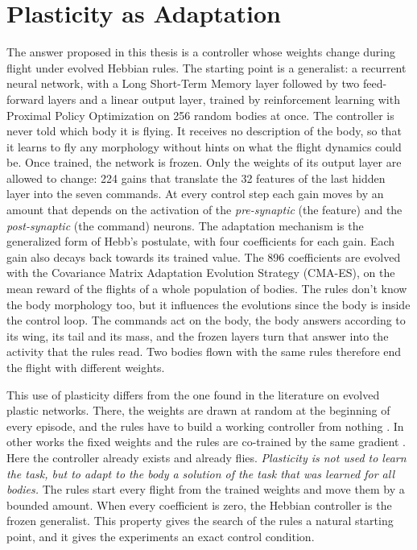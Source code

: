 \section{Plasticity as Adaptation}
\label{sec:intro-plasticity}

The answer proposed in this thesis is a controller whose weights change during flight under evolved Hebbian rules. The starting point is a generalist: a recurrent neural network, with a Long Short-Term Memory layer followed by two feed-forward layers and a linear output layer, trained by reinforcement learning with Proximal Policy Optimization on 256 random bodies at once. The controller is never told which body it is flying. It receives no description of the body, so that it learns to fly any morphology without hints on what the flight dynamics could be. Once trained, the network is frozen. Only the weights of its output layer are allowed to change: 224 gains that translate the 32 features of the last hidden layer into the seven commands. At every control step each gain moves by an amount that depends on the activation of the \emph{pre-synaptic} (the feature) and the \emph{post-synaptic} (the command) neurons. The adaptation mechanism is the generalized form of Hebb's postulate, with four coefficients for each gain. Each gain also decays back towards its trained value. The 896 coefficients are evolved with the Covariance Matrix Adaptation Evolution Strategy (CMA-ES), on the mean reward of the flights of a whole population of bodies. The rules don't know the body morphology too, but it influences the evolutions since the body is inside the control loop. The commands act on the body, the body answers according to its wing, its tail and its mass, and the frozen layers turn that answer into the activity that the rules read. Two bodies flown with the same rules therefore end the flight with different weights.

This use of plasticity differs from the one found in the literature on evolved plastic networks. There, the weights are drawn at random at the beginning of every episode, and the rules have to build a working controller from nothing \cite{floreano2000evolutionary, najarro2020meta, vandiggelen2025emergent}. In other works the fixed weights and the rules are co-trained by the same gradient \cite{miconi2018differentiable}. Here the controller already exists and already flies. \emph{Plasticity is not used to learn the task, but to adapt to the body a solution of the task that was learned for all bodies.} The rules start every flight from the trained weights and move them by a bounded amount. When every coefficient is zero, the Hebbian controller is the frozen generalist. This property gives the search of the rules a natural starting point, and it gives the experiments an exact control condition.

